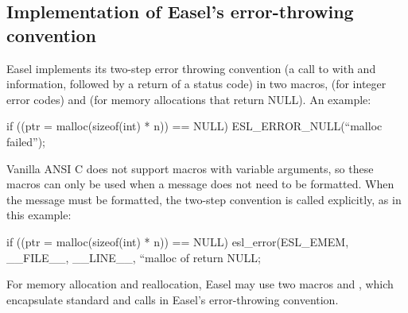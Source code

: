\subsection{Implementation of Easel's error-throwing convention}

Easel implements its two-step error throwing convention (a call to
 with  and 
information, followed by a return of a status code) in two macros,
 (for integer error codes) and
 (for memory allocations that return
NULL). An example:

\begin{cchunk}
if ((ptr = malloc(sizeof(int) * n)) == NULL) ESL_ERROR_NULL(``malloc failed'');
\end{cchunk}

Vanilla ANSI C does not support macros with variable arguments, so
these macros can only be used when a message does not need to be
formatted. When the message must be formatted, the two-step convention
is called explicitly, as in this example:

\begin{cchunk}
if ((ptr = malloc(sizeof(int) * n)) == NULL)
  {
     esl_error(ESL_EMEM, __FILE__, __LINE__, ``malloc of %
     return NULL;
  }
\end{cchunk}

For memory allocation and reallocation, Easel may use two macros
 and , which encapsulate
standard  and  calls in Easel's
error-throwing convention.


